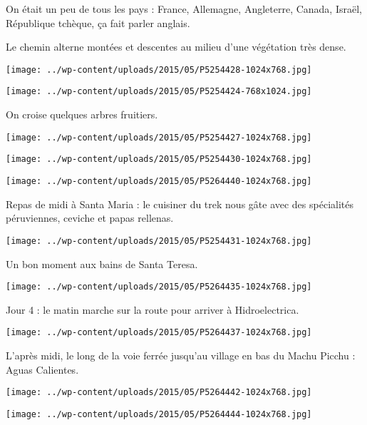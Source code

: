 On était un peu de tous les pays : France, Allemagne, Angleterre, Canada, Israël, République tchèque, ça fait parler anglais.

Le chemin alterne montées et descentes au milieu d'une végétation très dense. 
\begin{center} \texttt{[image: ../wp-content/uploads/2015/05/P5254428-1024x768.jpg]} \end{center}

\begin{center} \texttt{[image: ../wp-content/uploads/2015/05/P5254424-768x1024.jpg]} \end{center}

On croise quelques arbres fruitiers. 
\begin{center} \texttt{[image: ../wp-content/uploads/2015/05/P5254427-1024x768.jpg]} \end{center}

\begin{center} \texttt{[image: ../wp-content/uploads/2015/05/P5254430-1024x768.jpg]} \end{center}
\begin{center} \texttt{[image: ../wp-content/uploads/2015/05/P5264440-1024x768.jpg]} \end{center}
\pagebreak

Repas de midi à Santa Maria : le cuisiner du trek nous gâte avec des spécialités péruviennes, ceviche et papas rellenas. 
\begin{center} \texttt{[image: ../wp-content/uploads/2015/05/P5254431-1024x768.jpg]} \end{center}

Un bon moment aux bains de Santa Teresa. 
\begin{center} \texttt{[image: ../wp-content/uploads/2015/05/P5264435-1024x768.jpg]} \end{center}
\pagebreak

Jour 4 : le matin marche sur la route pour arriver à Hidroelectrica. 
\begin{center} \texttt{[image: ../wp-content/uploads/2015/05/P5264437-1024x768.jpg]} \end{center}

L'après midi, le long de la voie ferrée jusqu'au village en bas du Machu Picchu : Aguas Calientes. 
\begin{center} \texttt{[image: ../wp-content/uploads/2015/05/P5264442-1024x768.jpg]} \end{center}
\begin{center} \texttt{[image: ../wp-content/uploads/2015/05/P5264444-1024x768.jpg]} \end{center}

